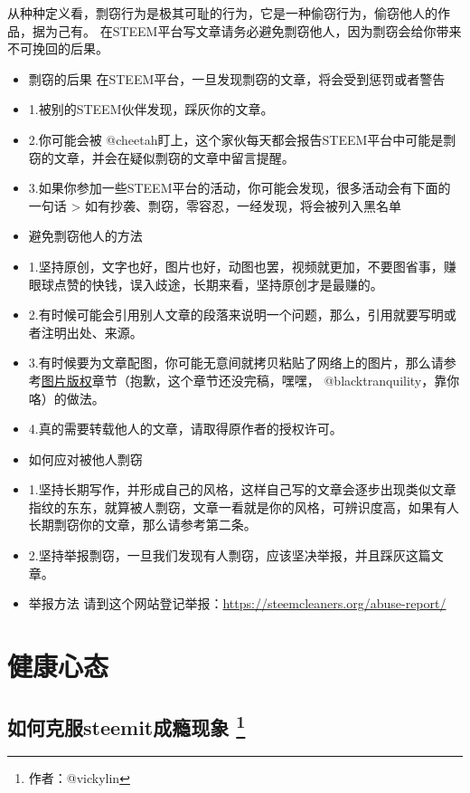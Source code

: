 \documentclass[]{ctexbook}
\begin{document}
从种种定义看，剽窃行为是极其可耻的行为，它是一种偷窃行为，偷窃他人的作品，据为己有。
在STEEM平台写文章请务必避免剽窃他人，因为剽窃会给你带来不可挽回的后果。

\begin{itemize}
\item
  剽窃的后果
  在STEEM平台，一旦发现剽窃的文章，将会受到惩罚或者警告
\item
  1.被别的STEEM伙伴发现，踩灰你的文章。
\item
  2.你可能会被 @cheetah盯上，这个家伙每天都会报告STEEM平台中可能是剽窃的文章，并会在疑似剽窃的文章中留言提醒。
\item
  3.如果你参加一些STEEM平台的活动，你可能会发现，很多活动会有下面的一句话
  \textgreater{} 如有抄袭、剽窃，零容忍，一经发现，将会被列入黑名单
\item
  避免剽窃他人的方法
\item
  1.坚持原创，文字也好，图片也好，动图也罢，视频就更加，不要图省事，赚眼球点赞的快钱，误入歧途，长期来看，坚持原创才是最赚的。
\item
  2.有时候可能会引用别人文章的段落来说明一个问题，那么，引用就要写明或者注明出处、来源。
\item
  3.有时候要为文章配图，你可能无意间就拷贝粘贴了网络上的图片，那么请参考\protect\hyperlink{tpbq}{图片版权}章节（抱歉，这个章节还没完稿，嘿嘿， @blacktranquility，靠你咯）的做法。
\item
  4.真的需要转载他人的文章，请取得原作者的授权许可。
\item
  如何应对被他人剽窃
\item
  1.坚持长期写作，并形成自己的风格，这样自己写的文章会逐步出现类似文章指纹的东东，就算被人剽窃，文章一看就是你的风格，可辨识度高，如果有人长期剽窃你的文章，那么请参考第二条。
\item
  2.坚持举报剽窃，一旦我们发现有人剽窃，应该坚决举报，并且踩灰这篇文章。
\item
  举报方法
  请到这个网站登记举报：\url{https://steemcleaners.org/abuse-report/}
\end{itemize}

\hypertarget{jkxt}{%
\section{健康心态}\label{jkxt}}

\hypertarget{steemit}{%
\subsection[如何克服steemit成瘾现象 ]{\texorpdfstring{如何克服steemit成瘾现象 \footnote{作者：@vickylin}}{如何克服steemit成瘾现象 }}\label{steemit}}
\end{document}
